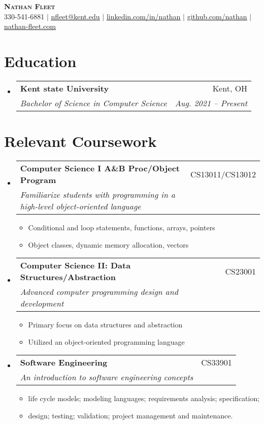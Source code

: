 \documentclass[letterpaper,11pt]{article}
\makeatletter
\newcommand{\resumeItem}[1]{
  \item\small{
    {#1 \vspace{-2pt}}
  }
}
\newcommand{\resumeSubheading}[4]{
  \vspace{-2pt}\item
    \begin{tabular*}{0.97\textwidth}[t]{l@{\extracolsep{\fill}}r}
      \textbf{#1} & #2 \\
      \textit{\small#3} & \textit{\small #4} \\
    \end{tabular*}\vspace{-7pt}
}
\newcommand{\resumeSubHeadingListStart}{\begin{itemize}[leftmargin=0.15in, label={}]}
\newcommand{\resumeSubHeadingListEnd}{\end{itemize}}
\newcommand{\resumeItemListStart}{\begin{itemize}}
\newcommand{\resumeItemListEnd}{\end{itemize}\vspace{-5pt}}
\makeatother
\begin{document}

\begin{center}
    \textbf{\Huge \scshape Nathan Fleet} \\ \vspace{1pt}
    \small 330-541-6881 $|$ \href{mailto:x@x.com}{\underline{nfleet@kent.edu}} $|$ 
    \href{https://www.linkedin.com/in/nathan-fleet-555897217/}{\underline{linkedin.com/in/nathan}} $|$
    \href{https://github.com/nathanfleet}{\underline{github.com/nathan}} $|$
    \href{https://www.nathan-fleet.com/}{\underline{nathan-fleet.com}}
\end{center}


\section{Education}
  \resumeSubHeadingListStart
    \resumeSubheading
      {Kent state University}{Kent, OH}
      {Bachelor of Science in Computer Science}{Aug. 2021 -- Present}
  \resumeSubHeadingListEnd


\section{Relevant Coursework}
  \resumeSubHeadingListStart
    \resumeSubheading
      {Computer Science I A\&B Proc/Object Program}{CS13011/CS13012}
      {Familiarize students with programming in a high-level object-oriented language}{}
      \resumeItemListStart
        \resumeItem{Conditional and loop statements, functions, arrays, pointers}
        \resumeItem{Object classes, dynamic memory allocation, vectors}
      \resumeItemListEnd
    \resumeSubheading
      {Computer Science II: Data Structures/Abstraction}{CS23001}
      {Advanced computer programming design and development}{}
      \resumeItemListStart
        \resumeItem{Primary focus on data structures and abstraction}
        \resumeItem{Utilized an object-oriented programming language}
      \resumeItemListEnd
    \resumeSubheading
      {Software Engineering}{CS33901}
      {An introduction to software engineering concepts}{}
      \resumeItemListStart
        \resumeItem{life cycle models; modeling languages; requirements analysis; specification;}
        \resumeItem{design; testing; validation; project management and maintenance.}
      \resumeItemListEnd
  \resumeSubHeadingListEnd
\end{document}
